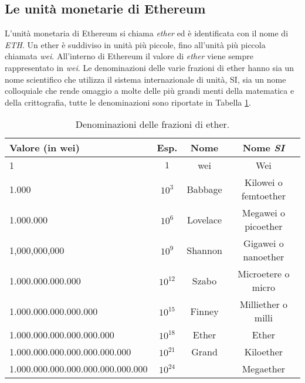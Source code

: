 \subsection{Le unità monetarie di Ethereum}
L'unità monetaria di Ethereum si chiama \textit{ether} ed è identificata con il nome di \textit{ETH}. Un ether è suddiviso in unità più piccole, fino all'unità più piccola chiamata \textit{wei}. All'interno di Ethereum il valore di \textit{ether} viene sempre rappresentato in \textit{wei}. Le denominazioni delle varie frazioni di ether hanno sia un nome scientifico che utilizza il sistema internazionale di unità, SI, sia un nome colloquiale che rende omaggio a molte delle più grandi menti della matematica e della crittografia, tutte le denominazioni sono riportate in Tabella \ref{tab:frazioni-di-ether}.
\begin{table}[]
	\centering
	\begin{tabular}{|l|c|c|c|}
		\hline
		\textbf{Valore (in wei)}			& \textbf{Esp.}	& \textbf{Nome} & \textbf{Nome \textit{SI}}\\ \hline
		1 									&	$1$			&	wei			&	Wei\\ \hline
		1.000 								&	$10^{3}$	&	Babbage		&	Kilowei o femtoether\\ \hline
		1.000.000 							&	$10^{6}$	&	Lovelace	&	Megawei o picoether\\ \hline
		1,000,000,000						&	$10^{9}$	&	Shannon		&	Gigawei o nanoether\\ \hline
		1.000.000.000.000					&	$10^{12}$	&	Szabo		&	Microetere o micro\\ \hline
		1.000.000.000.000.000				&	$10^{15}$	&	Finney		&	Milliether o milli\\ \hline
		1.000.000.000.000.000.000			&	$10^{18}$	&	Ether		&	Ether\\ \hline
		1.000.000.000.000.000.000.000		&	$10^{21}$	&	Grand		&	Kiloether \\ \hline
		1.000.000.000.000.000.000.000.000	&	$10^{24}$	&				&	Megaether \\ \hline
	\end{tabular}
	\caption{Denominazioni delle frazioni di ether.}
	\label{tab:frazioni-di-ether}
\end{table}

